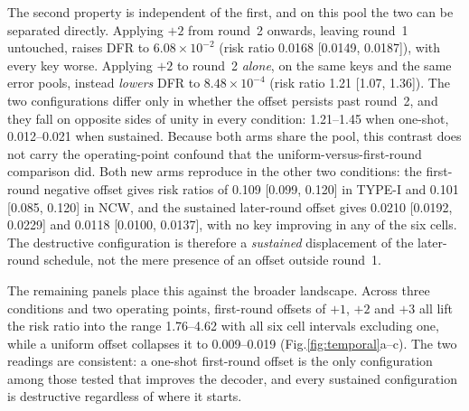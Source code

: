 \documentclass[lettersize,journal]{IEEEtran}
\begin{document}
The second property is independent of the first, and on this pool the two can be separated directly. Applying $+2$ from round~2 onwards, leaving round~1 untouched, raises DFR to $6.08\times10^{-2}$ (risk ratio 0.0168 [0.0149, 0.0187]), with every key worse. Applying $+2$ to round~2 \emph{alone}, on the same keys and the same error pools, instead \emph{lowers} DFR to $8.48\times10^{-4}$ (risk ratio 1.21 [1.07, 1.36]). The two configurations differ only in whether the offset persists past round~2, and they fall on opposite sides of unity in every condition: 1.21--1.45 when one-shot, 0.012--0.021 when sustained. Because both arms share the pool, this contrast does not carry the operating-point confound that the uniform-versus-first-round comparison did. Both new arms reproduce in the other two conditions: the first-round negative offset gives risk ratios of 0.109 [0.099, 0.120] in TYPE-I and 0.101 [0.085, 0.120] in NCW, and the sustained later-round offset gives 0.0210 [0.0192, 0.0229] and 0.0118 [0.0100, 0.0137], with no key improving in any of the six cells. The destructive configuration is therefore a \emph{sustained} displacement of the later-round schedule, not the mere presence of an offset outside round~1.

The remaining panels place this against the broader landscape. Across three conditions and two operating points, first-round offsets of $+1$, $+2$ and $+3$ all lift the risk ratio into the range 1.76--4.62 with all six cell intervals excluding one, while a uniform offset collapses it to 0.009--0.019 (Fig.\ref{fig:temporal}a--c). The two readings are consistent: a one-shot first-round offset is the only configuration among those tested that improves the decoder, and every sustained configuration is destructive regardless of where it starts.
\end{document}
